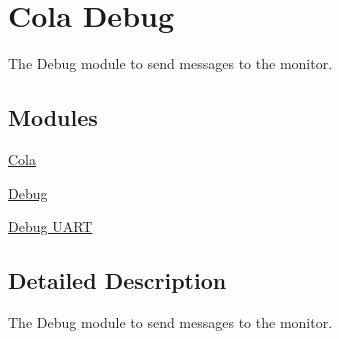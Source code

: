\hypertarget{group___cola___debug}{}\section{Cola Debug}
\label{group___cola___debug}


The Debug module to send messages to the monitor.  


\subsection*{Modules}
\begin{DoxyCompactItemize}
\item 
\hyperlink{group___cola}{Cola}
\item 
\hyperlink{group___debug}{Debug}
\item 
\hyperlink{group___debug___uart}{Debug U\+A\+RT}
\end{DoxyCompactItemize}


\subsection{Detailed Description}
The Debug module to send messages to the monitor. 

